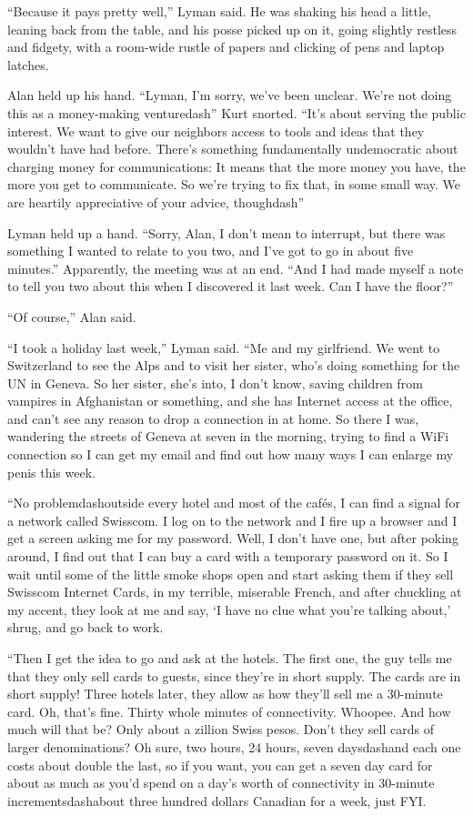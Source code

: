 ``Because it pays pretty well,'' Lyman said.  He was shaking his head
a little, leaning back from the table, and his posse picked up on it,
going slightly restless and fidgety, with a room-wide rustle of papers
and clicking of pens and laptop latches.

Alan held up his hand.  ``Lyman, I'm sorry, we've been unclear.  We're
not doing this as a money-making venturedash{}'' Kurt snorted.  ``It's
about serving the public interest.  We want to give our neighbors
access to tools and ideas that they wouldn't have had before.  There's
something fundamentally undemocratic about charging money for
communications:  It means that the more money you have, the more you
get to communicate.  So we're trying to fix that, in some small way. 
We are heartily appreciative of your advice, thoughdash{}''

Lyman held up a hand.  ``Sorry, Alan, I don't mean to interrupt, but
there was something I wanted to relate to you two, and I've got to go
in about five minutes.'' Apparently, the meeting was at an end.  ``And
I had made myself a note to tell you two about this when I discovered
it last week.  Can I have the floor?''

``Of course,'' Alan said.

``I took a holiday last week,'' Lyman said.  ``Me and my girlfriend. 
We went to Switzerland to see the Alps and to visit her sister, who's
doing something for the UN in Geneva.  So her sister, she's into, I
don't know, saving children from vampires in Afghanistan or something,
and she has Internet access at the office, and can't see any reason to
drop a connection in at home.  So there I was, wandering the streets
of Geneva at seven in the morning, trying to find a WiFi connection so
I can get my email and find out how many ways I can enlarge my penis
this week.

``No problemdash{}outside every hotel and most of the caf\'{e}s, I can
find a signal for a network called Swisscom.  I log on to the network
and I fire up a browser and I get a screen asking me for my password. 
Well, I don't have one, but after poking around, I find out that I can
buy a card with a temporary password on it.  So I wait until some of
the little smoke shops open and start asking them if they sell
Swisscom Internet Cards, in my terrible, miserable French, and after
chuckling at my accent, they look at me and say, `I have no clue what
you're talking about,' shrug, and go back to work.

``Then I get the idea to go and ask at the hotels.  The first one, the
guy tells me that they only sell cards to guests, since they're in
short supply.  The cards are in short supply!  Three hotels later,
they allow as how they'll sell me a 30-minute card.  Oh, that's fine. 
Thirty whole minutes of connectivity.  Whoopee.  And how much will
that be?  Only about a zillion Swiss pesos.  Don't they sell cards of
larger denominations?  Oh sure, two hours, 24 hours, seven daysdash{}and
each one costs about double the last, so if you want, you can get a
seven day card for about as much as you'd spend on a day's worth of
connectivity in 30-minute incrementsdash{}about three hundred dollars
Canadian for a week, just FYI.

